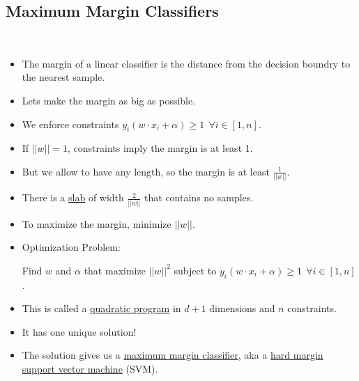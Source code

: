 \documentclass[10pt]{article}
\begin{document}
	\subsection*{Maximum Margin Classifiers}
		\
		\begin{itemize}
			\item The margin of a linear classifier is the distance from the decision boundry to the nearest sample.
			\item Lets make the margin as big as possible.
				\begin{center}
				\end{center}
			\item We enforce constraints $y_{i}(w \cdot x_{i} + \alpha) \geq 1 \ \ \forall i \in [1, n]$.
			\item If $||w|| = 1$, constraints imply the margin is at least 1.
			\item But we allow to have any length, so the margin is at least $\frac{1}{||w||}$.
			\item There is a \underline{slab} of width $\frac{2}{||w||}$ that contains no samples.
			\item To maximize the margin, minimize $||w||$.
			\item Optimization Problem:
				\begin{center}
					Find $w$ and $\alpha$ that maximize $||w||^{2}$ subject to $y_{i}(w \cdot x_{i} + \alpha) \geq 1 \ \ \forall i \in [1, n]$.
				\end{center}
			\item This is called a \underline{quadratic program} in $d+1$ dimensions and $n$ constraints.
			\item It has one unique solution!
			\item The solution gives us a \underline{maximum margin classifier}, aka a \underline{hard margin support vector machine} (SVM).
		\end{itemize}
\end{document}
